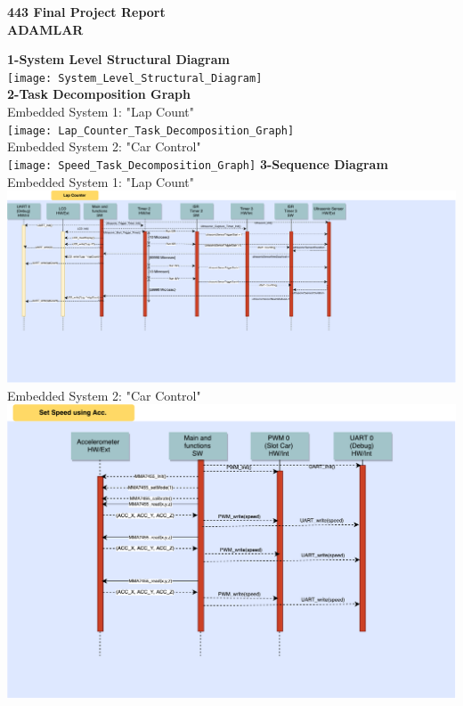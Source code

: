 \documentclass{article}
\begin{document}
\begin{center}
{\huge\textbf {443 Final Project Report}}\\[1in]
{\huge\textbf {ADAMLAR}}\\
\end{center}
\clearpage

{\huge\textbf {1-System Level Structural Diagram}}
\\
\texttt{[image: System\_Level\_Structural\_Diagram]}
\pagebreak
\\
{\huge\textbf {2-Task Decomposition Graph}}
\\
{\huge {Embedded System 1: "Lap Count"}}
\\
\texttt{[image: Lap\_Counter\_Task\_Decomposition\_Graph]}
\\[0.2in]
{\huge {Embedded System 2: "Car Control"}}
\\[0.2in]
\texttt{[image: Speed\_Task\_Decomposition\_Graph]}
\clearpage
{\huge\textbf {3-Sequence Diagram}}
\\
{\huge {Embedded System 1: "Lap Count"}}
\\
\includegraphics[scale=0.3]{Lap_Counter_Seq_Diagram}
\\
{\huge {Embedded System 2: "Car Control"}}
\\
\includegraphics[scale=0.5]{Read_Acc_Control_Speed}
\end{document}
